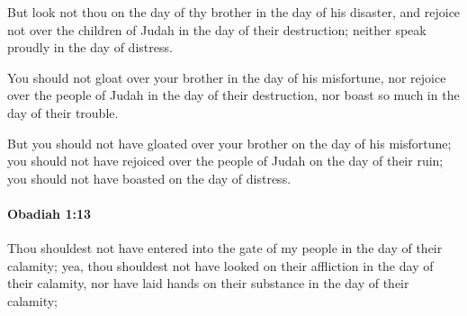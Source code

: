 			\begin{versebox}
					\item[BHS] 
					\item[LXX] 
					\item[ASV] But look not thou on the day of thy brother in the day of his disaster, and rejoice not over the children of Judah in the day of their destruction; neither speak proudly in the day of distress.
					\item[NIV] You should not gloat over your brother in the day of his misfortune, nor rejoice over the people of Judah in the day of their destruction, nor boast so much in the day of their trouble.
					\item[NRSV] But you should not have gloated over your brother on the day of his misfortune; you should not have rejoiced over the people of Judah on the day of their ruin; you should not have boasted on the day of distress.
			\end{versebox}

		\paragraph{Obadiah 1:13} %
			\label{OBADIAH-1-13}

			Thou shouldest not have entered into the gate of my people in the day of their calamity; yea, thou shouldest not have looked on their affliction in the day of their calamity, nor have laid hands on their substance in the day of their calamity;

